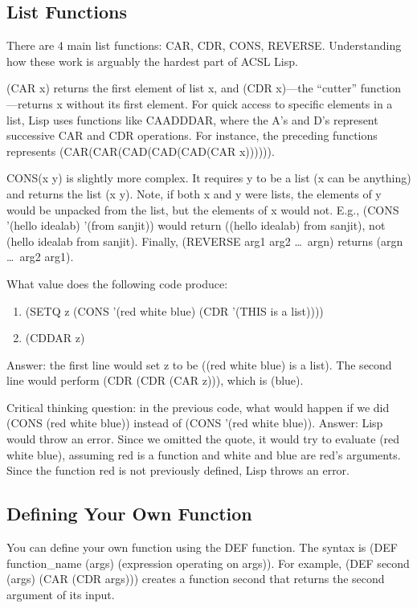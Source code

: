 \documentclass[11pt,letterpaper]{article}
\begin{document}
    \subsection{List Functions}
    There are 4 main list functions: CAR, CDR, CONS, REVERSE.
    Understanding how these work is arguably the hardest part of ACSL Lisp.

    (CAR x) returns the first element of list x, and (CDR x)---the ``cutter'' function---returns
    x without its first element.
    For quick access to specific elements in a list, Lisp
    uses functions like CAADDDAR, where the A's and D's represent successive
    CAR and CDR operations.
    For instance, the preceding functions represents (CAR(CAR(CAD(CAD(CAD(CAR x)))))).

    CONS(x y) is slightly more complex.
    It requires y to be a list (x can be anything) and returns the list (x y).
    Note, if both x and y were lists, the elements of y would be unpacked from
    the list, but the elements of x would not.
    E.g., (CONS '(hello idealab) '(from sanjit)) would return ((hello idealab) from sanjit),
    not (hello idealab from sanjit).
    Finally, (REVERSE arg1 arg2 \ldots~argn) returns (argn \ldots~arg2 arg1).

    What value does the following code produce:
    \begin{enumerate}
        \item (SETQ z (CONS '(red white blue) (CDR '(THIS is a list))))
        \item (CDDAR z)
    \end{enumerate}
    Answer: the first line would set z to be ((red white blue) is a list).
    The second line would perform (CDR (CDR (CAR z))), which is (blue).

    Critical thinking question: in the previous code, what would
    happen if we did (CONS (red white blue)) instead of (CONS '(red white blue)).
    Answer: Lisp would throw an error.
    Since we omitted the quote, it would try to evaluate (red white blue),
    assuming red is a function and white and blue are red's arguments.
    Since the function red is not previously defined, Lisp throws an error.

    \subsection{Defining Your Own Function}
    You can define your own function using the DEF function.
    The syntax is (DEF function\_name (args) (expression operating on args)).
    For example, (DEF second (args) (CAR (CDR args))) creates
    a function second that returns the second argument of its input.
\end{document}
